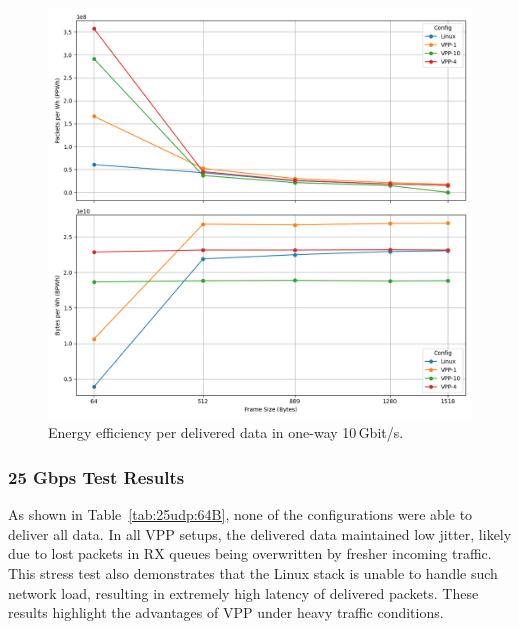 \begin{figure}[!htbp]
    \centering
    \includegraphics[width=\linewidth]{images/consumption-10g.png}
    \caption{Energy efficiency per delivered data in one-way 10\,Gbit/s.}
    \label{fig:10g}
\end{figure}



\subsubsection{25 Gbps Test Results}

As shown in Table~\ref{tab:25udp:64B}, none of the configurations were able to deliver all data.
In all VPP setups, the delivered data maintained low jitter,
likely due to lost packets in RX queues being overwritten by fresher incoming traffic.
This stress test also demonstrates that the Linux stack is unable to handle such network load, resulting in extremely high latency of delivered packets.
These results highlight the advantages of VPP under heavy traffic conditions.

